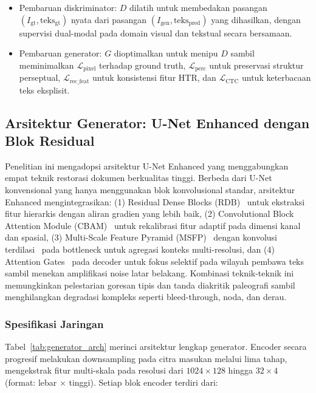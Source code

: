 \documentclass[journal]{IEEEtran}
\begin{document}
\begin{itemize}
    \item Pembaruan diskriminator: $D$ dilatih untuk membedakan pasangan $(I_{\text{gt}}, \text{teks}_{\text{gt}})$ nyata dari pasangan $(I_{\text{gen}}, \text{teks}_{\text{pred}})$ yang dihasilkan, dengan supervisi dual-modal pada domain visual dan tekstual secara bersamaan.
    
    \item Pembaruan generator: $G$ dioptimalkan untuk menipu $D$ sambil meminimalkan $\mathcal{L}_{\text{pixel}}$ terhadap ground truth, $\mathcal{L}_{\text{perc}}$ untuk preservasi struktur perseptual, $\mathcal{L}_{\text{rec\_feat}}$ untuk konsistensi fitur HTR, dan $\mathcal{L}_{\text{CTC}}$ untuk keterbacaan teks eksplisit.
\end{itemize}

\subsection{Arsitektur Generator: U-Net Enhanced dengan Blok Residual}

Penelitian ini mengadopsi arsitektur U-Net Enhanced yang menggabungkan empat teknik restorasi dokumen berkualitas tinggi. Berbeda dari U-Net konvensional yang hanya menggunakan blok konvolusional standar, arsitektur Enhanced mengintegrasikan: (1) Residual Dense Blocks (RDB)~\cite{zhang2018residual} untuk ekstraksi fitur hierarkis dengan aliran gradien yang lebih baik, (2) Convolutional Block Attention Module (CBAM)~\cite{woo2018cbam} untuk rekalibrasi fitur adaptif pada dimensi kanal dan spasial, (3) Multi-Scale Feature Pyramid (MSFP)~\cite{lin2017fpn} dengan konvolusi terdilasi~\cite{chen2017deeplab} pada bottleneck untuk agregasi konteks multi-resolusi, dan (4) Attention Gates~\cite{oktay2018attention} pada decoder untuk fokus selektif pada wilayah pembawa teks sambil menekan amplifikasi noise latar belakang. Kombinasi teknik-teknik ini memungkinkan pelestarian goresan tipis dan tanda diakritik paleografi sambil menghilangkan degradasi kompleks seperti bleed-through, noda, dan derau.

\subsubsection{Spesifikasi Jaringan}

Tabel~\ref{tab:generator_arch} merinci arsitektur lengkap generator. Encoder secara progresif melakukan downsampling pada citra masukan melalui lima tahap, mengekstrak fitur multi-skala pada resolusi dari $1024 \times 128$ hingga $32 \times 4$ (format: lebar $\times$ tinggi). Setiap blok encoder terdiri dari:
\end{document}
